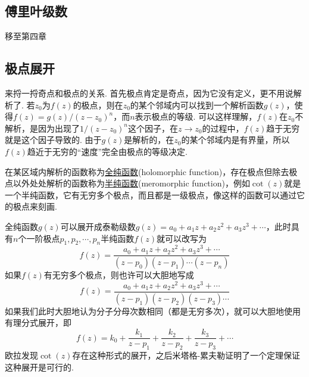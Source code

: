 
\subsection{傅里叶级数}

移至第四章

\subsection{极点展开}

来捋一捋奇点和极点的关系. 首先极点肯定是奇点，因为它没有定义，更不用说解析了. 若\(z_0\)为\(f(z)\)的极点，则在\(z_0\)的某个邻域内可以找到一个解析函数\(g(z)\)，使得\(f(z)=g(z)/(z-z_0)^n\)，而\(n\)表示极点的等级. 可以这样理解，\(f(z)\)在\(z_0\)不解析，是因为出现了\(1/(z-z_0)^n\)这个因子，在\(z \to z_0\)的过程中，\(f(z)\)趋于无穷就是这个因子导致的. 由于\(g(z)\)是解析的，在\(z_0\)的某个邻域内是有界量，所以\(f(z)\)趋近于无穷的“速度”完全由极点的等级决定.

在某区域内解析的函数称为\uline{全纯函数}(holomorphic function)，存在极点但除去极点以外处处解析的函数称为\uline{半纯函数}(meromorphic function)，例如\(\cot(z)\)就是一个半纯函数，它有无穷多个极点，而且都是一级极点，像这样的函数可以通过它的极点来刻画. 

全纯函数\(g(z)\)可以展开成泰勒级数\(g(z)=a_0+a_1z+a_2z^2+a_3z^3+\cdots\)，此时具有\(n\)个一阶极点\(p_1, p_2, \cdots, p_n\)半纯函数\(f(z)\)就可以改写为
\[f(z)=\frac{a_0+a_1z+a_2z^2+a_3z^3+\cdots}{(z-p_0)(z-p_1)\cdots(z-p_n)}\]
如果\(f(z)\)有无穷多个极点，则也许可以大胆地写成
\[f(z)=\frac{a_0+a_1z+a_2z^2+a_3z^3+\cdots}{(z-p_1)(z-p_2)(z-p_3)\cdots}\]
如果我们此时大胆地认为分子分母次数相同（都是无穷多次），就可以大胆地使用有理分式展开，即
\[f(z)=k_0+\frac{k_1}{z-p_1}+\frac{k_2}{z-p_2}+\frac{k_3}{z-p_3}+\cdots\]
欧拉发现\(\cot(z)\)存在这种形式的展开，之后米塔格-累夫勒证明了一个定理保证这种展开是可行的.

